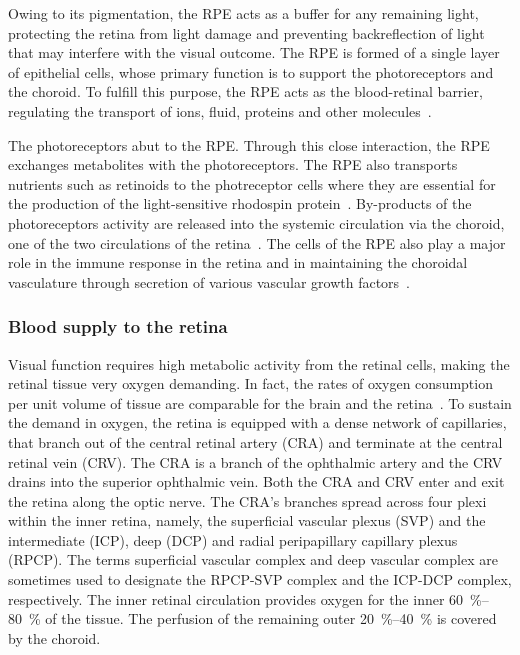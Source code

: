 \documentclass{article}
\begin{document}
Owing to its pigmentation, the RPE acts as a buffer for any remaining light, protecting the retina from light damage and preventing backreflection of light that may interfere with the visual outcome.
The RPE is formed of a single layer of epithelial cells, whose primary function is to support the photoreceptors and the choroid.
To fulfill this purpose, the RPE acts as the blood-retinal barrier, regulating the transport of ions, fluid, proteins and other molecules~\cite{Boulton_2001}.

The photoreceptors abut to the RPE.
Through this close interaction, the RPE exchanges metabolites with the photoreceptors.
The RPE also transports nutrients such as retinoids to the photreceptor cells where they are essential for the production of the light-sensitive rhodospin protein~\cite{Boulton_2001}.
By-products of the photoreceptors activity are released into the systemic circulation via the choroid, one of the two circulations of the retina~\cite{Boulton_2001}.
The cells of the RPE also play a major role in the immune response in the retina and in maintaining the choroidal vasculature through secretion of various vascular growth factors~\cite{Boulton_2001,Detrick_2020}.

\subsubsection{Blood supply to the retina}

Visual function requires high metabolic activity from the retinal cells, making the retinal tissue very oxygen demanding.
In fact, the rates of oxygen consumption per unit volume of tissue are comparable for the brain and the retina~\cite{Medrano_1995}.
To sustain the demand in oxygen, the retina is equipped with a dense network of capillaries, that branch out of the central retinal artery (CRA) and terminate at the central retinal vein (CRV).
The CRA is a branch of the ophthalmic artery and the CRV drains into the superior ophthalmic vein.
Both the CRA and CRV enter and exit the retina along the optic nerve.
The CRA's branches spread across four plexi within the inner retina, namely, the superficial vascular plexus (SVP) and the intermediate (ICP), deep (DCP) and radial peripapillary capillary plexus (RPCP).
The terms superficial vascular complex and deep vascular complex are sometimes used to designate the RPCP-SVP complex and the ICP-DCP complex, respectively.
The inner retinal circulation provides oxygen for the inner \SIrange{60}{80}{\percent} of the tissue.
The perfusion of the remaining outer \SIrange{20}{40}{\percent} is covered by the choroid\cite{Birol_2007}.
\end{document}
